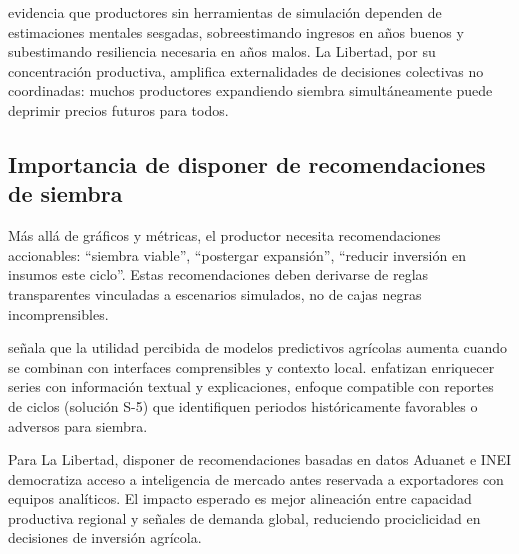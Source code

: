 \citet{VargasCordova2025} evidencia que productores sin herramientas de simulaci\'on dependen de estimaciones mentales sesgadas, sobreestimando ingresos en a\~nos buenos y subestimando resiliencia necesaria en a\~nos malos. La Libertad, por su concentraci\'on productiva, amplifica externalidades de decisiones colectivas no coordinadas: muchos productores expandiendo siembra simult\'aneamente puede deprimir precios futuros para todos.

\subsection{Importancia de disponer de recomendaciones de siembra}

M\'as all\'a de gr\'aficos y m\'etricas, el productor necesita recomendaciones accionables: ``siembra viable'', ``postergar expansi\'on'', ``reducir inversi\'on en insumos este ciclo''. Estas recomendaciones deben derivarse de reglas transparentes vinculadas a escenarios simulados, no de cajas negras incomprensibles.

\citet{Theofilou2025} se\~nala que la utilidad percibida de modelos predictivos agr\'icolas aumenta cuando se combinan con interfaces comprensibles y contexto local. \citet{ReisFilho2022} enfatizan enriquecer series con informaci\'on textual y explicaciones, enfoque compatible con reportes de ciclos (soluci\'on S-5) que identifiquen periodos hist\'oricamente favorables o adversos para siembra.

Para La Libertad, disponer de recomendaciones basadas en datos Aduanet e INEI democratiza acceso a inteligencia de mercado antes reservada a exportadores con equipos anal\'iticos. El impacto esperado es mejor alineaci\'on entre capacidad productiva regional y se\~nales de demanda global, reduciendo prociclicidad en decisiones de inversi\'on agr\'icola.
